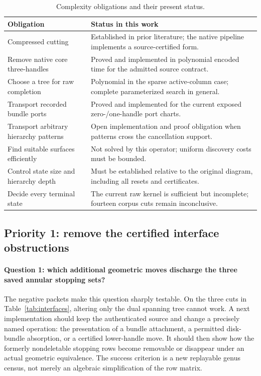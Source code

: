 \begin{table}[htbp]
\centering\small
\caption{Complexity obligations and their present status.}
\begin{tabular}{>{\raggedright\arraybackslash}p{}>{\raggedright\arraybackslash}p{}}
\toprule
Obligation & Status in this work\\
\midrule
Compressed cutting & Established in prior literature; the native pipeline
implements a source-certified form.\\
Remove native core three-handles & Proved and implemented in polynomial
encoded time for the admitted source contract.\\
Choose a tree for raw completion & Polynomial in the sparse active-column
case; complete parameterized search in general.\\
Transport recorded bundle ports & Proved and implemented for the current
exposed zero-/one-handle port charts.\\
Transport arbitrary hierarchy patterns & Open implementation and proof
obligation when patterns cross the cancellation support.\\
Find suitable surfaces efficiently & Not solved by this operator;
uniform discovery costs must be bounded.\\
Control state size and hierarchy depth & Must be established relative to
the original diagram, including all resets and certificates.\\
Decide every terminal state & The current raw kernel is sufficient but
incomplete; fourteen corpus cuts remain inconclusive.\\
\bottomrule
\end{tabular}
\end{table}

\subsection{Priority 1: remove the certified interface obstructions}
\paragraph{Question 1: which additional geometric moves discharge the three
saved annular stopping sets?}
The negative packets make this question sharply testable.  On the three
cuts in Table~\ref{tab:interfaces}, altering only the dual spanning tree
cannot work.  A next implementation should keep the authenticated source
and change a precisely named operation: the presentation of a bundle
attachment, a permitted disk-bundle absorption, or a certified lower-handle
move.  It should then show how the formerly nondeletable stopping rows
become removable or disappear under an actual geometric equivalence.
The success criterion is a new replayable genus census, not merely an
algebraic simplification of the row matrix.

